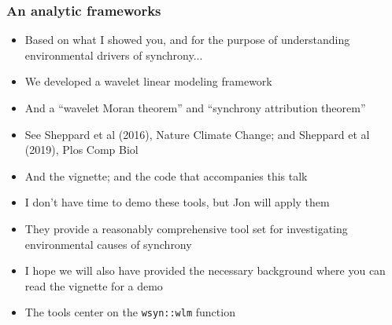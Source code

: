 \documentclass{beamer}
\begin{document}
\begin{frame}
\frametitle{An analytic frameworks}
\begin{itemize}
\item Based on what I showed you, and for the purpose of understanding environmental drivers of synchrony...
\item We developed a wavelet linear modeling framework
\item And a ``wavelet Moran theorem'' and ``synchrony attribution theorem''
\item See Sheppard et al (2016), Nature Climate Change; and Sheppard et al (2019), Plos Comp Biol
\item And the vignette; and the code that accompanies this talk
\item I don't have time to demo these tools, but Jon will apply them
\item They provide a reasonably comprehensive tool set for investigating environmental causes of synchrony
\item I hope we will also have provided the necessary background where you can read the vignette for a demo
\item The tools center on the \texttt{wsyn::wlm} function
\end{itemize}
\end{frame}
\end{document}
